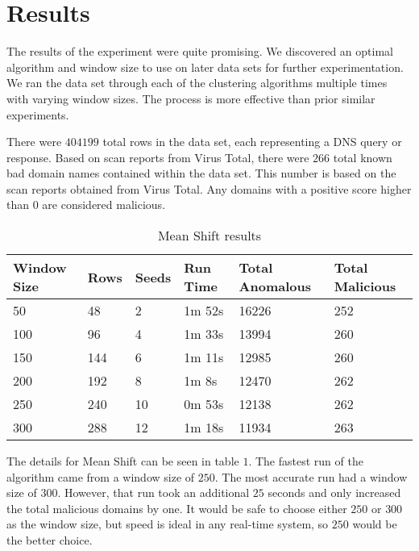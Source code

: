 \section{Results}

The results of the experiment were quite promising.
We discovered an optimal algorithm and window size to use on later data sets for further experimentation.
We ran the data set through each of the clustering algorithms multiple times with varying window sizes.
The process is more effective than prior similar experiments.

There were $404199$ total rows in the data set, each representing a DNS query or response.
Based on scan reports from Virus Total, there were $266$ total known bad domain names contained
within the data set.
This number is based on the scan reports obtained from Virus Total.
Any domains with a positive score higher than $0$ are considered malicious.

\begin{table}[]
\centering
\caption{Mean Shift results}
\label{my-label}
\begin{tabular}{@{}|l|l|l|l|l|l|@{}}
\toprule
Window Size & Rows & Seeds & Run Time & Total Anomalous & Total Malicious \\ \midrule
50          & 48   & 2     & 1m 52s   & 16226           & 252             \\ \midrule
100         & 96   & 4     & 1m 33s   & 13994           & 260             \\ \midrule
150         & 144  & 6     & 1m 11s   & 12985           & 260             \\ \midrule
200         & 192  & 8     & 1m 8s    & 12470           & 262             \\ \midrule
250         & 240  & 10    & 0m 53s   & 12138           & 262             \\ \midrule
300         & 288  & 12    & 1m 18s   & 11934           & 263             \\ \bottomrule
\end{tabular}
\end{table}

The details for Mean Shift can be seen in table $1$.
The fastest run of the algorithm came from a window size of $250$.
The most accurate run had a window size of $300$.
However, that run took an additional $25$ seconds and only increased the total malicious domains by one.
It would be safe to choose either $250$ or $300$ as the window size, but speed is ideal in any
real-time system, so $250$ would be the better choice.

